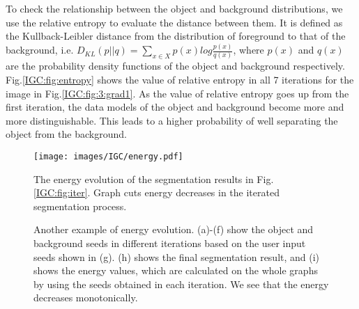 To check the relationship between the object and background distributions, we use the relative
entropy to evaluate the distance between them. It is defined as the Kullback-Leibler distance from the distribution of foreground to that of the background, i.e. $D_{KL}(p||q)=\sum_{x\in X}        p(x)log\frac{p(x)}{q(x)}$, where $p(x)$ and $q(x)$ are the probability density functions of the object and background respectively. Fig.\ref{IGC:fig:entropy} shows the value of relative entropy in all 7 iterations for the image in Fig.\ref{IGC:fig:3:grad1}.  As the value of relative entropy goes up from the first iteration, the data models of the object and background become more and more distinguishable. This leads to a higher probability of well separating the object from the background.

 \begin{figure}[htp]
        \centering
        {\texttt{[image: images/IGC/energy.pdf]}}
        \caption{ The energy evolution of the segmentation results in Fig. \ref{IGC:fig:iter}. Graph cuts energy decreases in the iterated segmentation process.}
        \label{IGC:fig:energy1}
        \end{figure}

  \begin{figure}[htp]
        \centering
        {
        }
        \caption{Another example of energy evolution. (a)-(f) show the object and
        background seeds in different iterations based on the user input seeds
        shown in (g). (h) shows the final segmentation result, and (i) shows the
         energy values, which are calculated on the whole graphs by using the seeds
         obtained in each iteration. We see that the energy decreases monotonically. }
        \label{IGC:fig:energy2}
        \end{figure}

